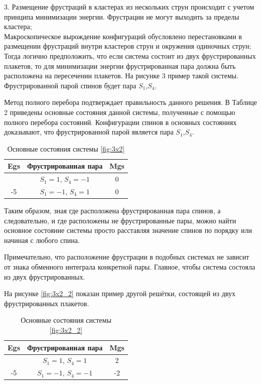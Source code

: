 \documentclass[utf8, babel, sor, jor, amsmath, amssymb, reprint]{elsarticle} %
\begin{document}
3. Размещение фрустраций в кластерах из нескольких струн происходит с учетом принципа минимизации энергии. Фрустрации не могут выходить за пределы кластера;\\

Макроскопическое вырождение конфигураций обусловлено перестановками в размещении фрустраций внутри кластеров струн и окружения одиночных струн;\\  




Тогда логично предположить, что если система состоит из двух фрустрированных плакетов, то для минимизации энергии фрустрированная пара должна быть расположена на пересечении плакетов. На рисунке 3 пример такой системы. Фрустрированной парой спинов будет пара $S_1$,$S_4$.



Метод полного перебора подтверждает правильность данного решения. В Таблице 2 приведены основные состояния данной системы, полученные с помощью полного перебора состояний. Конфигурации спинов в основных состояниях доказывают, что фрустрированной парой является пара $S_1$,$S_4$. 

\begin{table}[h]
	\centering
	\begin{tabular}{|c|c|c|}
		\hline
		 Egs   &   Фрустрированная пара & Mgs\\
		 \hline
		  &  $S_1=1$, $S_4=-1$ & 0 \\
		  \cline{2-3}
		  	-5	\multirow{3}{*}{}
		   &   $S_1=-1$, $S_4=1$ & 0 \\
		\hline
	\end{tabular}
	\caption{Основные состояния системы \eqref{fig:3x2} }
	\label{tab:gs}
\end{table}

Таким образом, зная где расположена фрустрированная пара спинов, а следовательно, и где расположены не фрустрированные пары, можно найти основное состояние системы просто расставляя значение спинов по порядку или начиная с любого спина. 

Примечательно, что расположение фрустрации в подобных системах не зависит от знака обменного интеграла конкретной пары. Главное, чтобы система состояла из двух фрустрированных.


На рисунке \eqref{fig:3x2_2} показан пример другой решётки, состоящей из двух фрустрированных плакетов.

\begin{table}[h]
	\centering
	\begin{tabular}{|c|c|c|}
		\hline
		Egs   &   Фрустрированная пара & Mgs \\
		\hline
		   &  $S_1=1$, $S_4=1$ & 2 \\
		\cline{2-3}
		-5	\multirow{3}{*}{}
		 &   $S_1=-1$, $S_4=-1$ & -2 \\
		\hline
	\end{tabular}
	\caption{Основные состояния системы \eqref{fig:3x2_2}}
	\label{tab:gs2}
\end{table}
\end{document}
